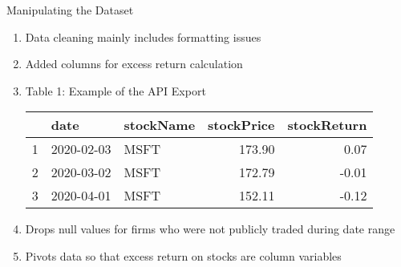 \documentclass[handout,t]{beamer}
\begin{document}
        \begin{frame}[allowframebreaks]{Manipulating the Dataset}
            \begin{doublespacing}
            	\begin{enumerate}
            	    \item Data cleaning mainly includes formatting issues
            	    \item Added columns for excess return calculation
            	    \item Table 1: Example of the API Export 
                            \begin{center}
                                \begin{table}[ht]
                                \centering
                                \begin{tabular}{rllrr}
                                  \hline
                                 & date & stockName & stockPrice & stockReturn \\ 
                                  \hline

                                  1 & 2020-02-03 & MSFT & 173.90 & 0.07 \\ 
                                  2 & 2020-03-02 & MSFT & 172.79 & -0.01 \\ 
                                  3 & 2020-04-01 & MSFT & 152.11 & -0.12 \\ 
                                   \hline
                                \end{tabular}
                                \end{table}
                            \end{center}
                    \framebreak
                    \item Drops null values for firms who were not publicly traded during date range
                    \item Pivots data so that excess return on stocks are column variables 
            	\end{enumerate}
            \end{doublespacing}
        \end{frame}
     
\end{document}
